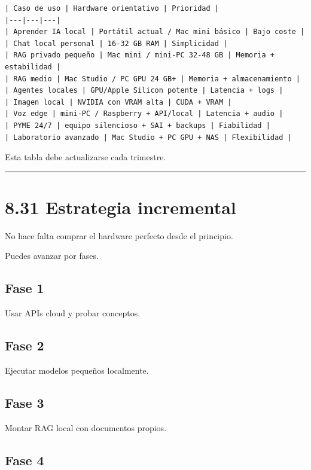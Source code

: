 \begin{lstlisting}
| Caso de uso | Hardware orientativo | Prioridad |
|---|---|---|
| Aprender IA local | Portátil actual / Mac mini básico | Bajo coste |
| Chat local personal | 16-32 GB RAM | Simplicidad |
| RAG privado pequeño | Mac mini / mini-PC 32-48 GB | Memoria + estabilidad |
| RAG medio | Mac Studio / PC GPU 24 GB+ | Memoria + almacenamiento |
| Agentes locales | GPU/Apple Silicon potente | Latencia + logs |
| Imagen local | NVIDIA con VRAM alta | CUDA + VRAM |
| Voz edge | mini-PC / Raspberry + API/local | Latencia + audio |
| PYME 24/7 | equipo silencioso + SAI + backups | Fiabilidad |
| Laboratorio avanzado | Mac Studio + PC GPU + NAS | Flexibilidad |
\end{lstlisting}

Esta tabla debe actualizarse cada trimestre.

\begin{center}\rule{0.5\linewidth}{0.5pt}\end{center}

\section{8.31 Estrategia incremental}\label{estrategia-incremental}

No hace falta comprar el hardware perfecto desde el principio.

Puedes avanzar por fases.

\subsection{Fase 1}\label{fase-1}

Usar APIs cloud y probar conceptos.

\subsection{Fase 2}\label{fase-2}

Ejecutar modelos pequeños localmente.

\subsection{Fase 3}\label{fase-3}

Montar RAG local con documentos propios.

\subsection{Fase 4}\label{fase-4}

